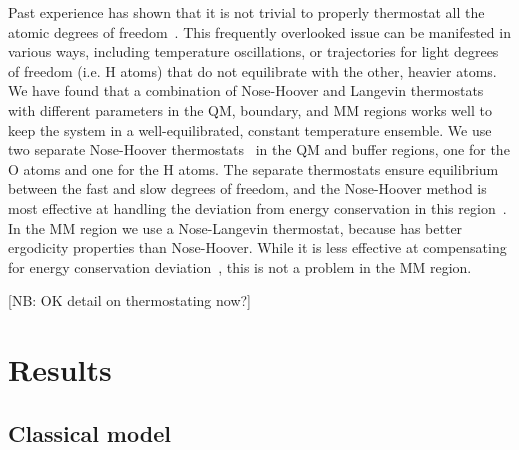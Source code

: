 \documentclass[11pt]{revtex4}
\begin{document}
Past experience has shown that it is not trivial to properly thermostat
all the atomic degrees of freedom~\cite{winfield_thesis_2009a}.
This frequently overlooked issue can be manifested in various ways,
including temperature oscillations, or trajectories for light degrees
of freedom (i.e. H atoms) that do not equilibrate with the other,
heavier atoms.  We have found that a combination of Nose-Hoover and
Langevin thermostats with different parameters in the QM, boundary,
and MM regions works well to keep the system in a well-equilibrated,
constant temperature ensemble.  We use two separate Nose-Hoover
thermostats~\cite{nose_mol_phys_1984a} in the QM and buffer regions,
one for the O atoms and one for the H atoms.  The separate thermostats
ensure equilibrium between the fast and slow degrees of freedom, and
the Nose-Hoover method is most effective at handling the deviation from
energy conservation in this region~\cite{winfield_thesis_2009a}.  In the
MM region we use a Nose-Langevin thermostat, because has better ergodicity
properties than Nose-Hoover.  While it is less effective at compensating
for energy conservation deviation~\cite{winfield_thesis_2009a}, this is
not a problem in the MM region.

[NB: OK detail on thermostating now?]

\section{Results}

\subsection{Classical model}
\end{document}
